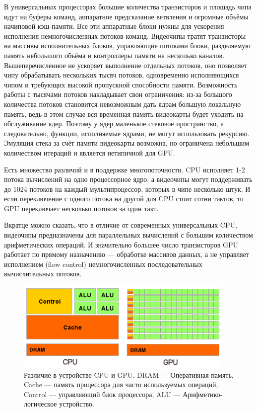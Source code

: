 В универсальных процессорах большие количества транзисторов и площадь чипа идут на буферы команд, аппаратное предсказание ветвления и огромные объёмы начиповой кэш-памяти. Все эти аппаратные блоки нужны для ускорения исполнения немногочисленных потоков команд. Видеочипы тратят транзисторы на массивы исполнительных блоков, управляющие потоками блоки, разделяемую память небольшого объёма и контроллеры памяти на несколько каналов. Вышеперечисленное не ускоряет выполнение отдельных потоков, оно позволяет чипу обрабатывать нескольких тысяч потоков, одновременно исполняющихся чипом и требующих высокой пропускной способности памяти. Возможность работы с тысячами потоков накладывает свои ограничения: из-за большого количества потоков становится невозможным дать ядрам большую локальную память, ведь в этом случае вся временная память видеокарты будет уходить на обслуживание ядер. Поэтому у ядер маленькое стековое пространство, а следовательно, функции, исполняемые ядрами, не могут использовать рекурсию. Эмуляция стека за счёт памяти видеокарты возможна, но ограничена небольшим количеством итераций и является нетипичной для GPU.

Есть множество различий и в поддержке многопоточности. CPU исполняет 1-2 потока вычислений на одно процессорное ядро, а видеочипы могут поддерживать до 1024 потоков на каждый мультипроцессор, которых в чипе несколько штук. И если переключение с одного потока на другой для CPU стоит сотни тактов, то GPU переключает несколько потоков за один такт.

Вкратце можно сказать, что в отличие от современных универсальных CPU, видеочипы предназначены для параллельных вычислений с большим количеством арифметических операций. И значительно большее число транзисторов GPU работает по прямому назначению — обработке массивов данных, а не управляет исполнением (flow control) немногочисленных последовательных вычислительных потоков. 

\begin{figure}[ht!]
\begin{center}
\includegraphics[width=0.8\linewidth]{img/cpu_vs_gpu.png}
\caption{Различие в устройстве CPU и GPU. DRAM --- Оперативная память, Cache --- память процессора для часто используемых операций, Control --- управляющий блок процессора, ALU --- Арифметико-логическое устройство.}
\end{center}
\end{figure}

